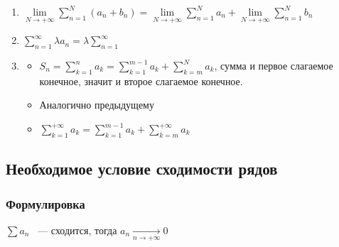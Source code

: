 \documentclass{article}
\begin{document}
                \begin{enumerate}
                
                    \item $\lim\limits_{N \rightarrow +\infty} \sum\limits^N_{n = 1} (a_n + b_n) = \lim\limits_{N \rightarrow +\infty} \sum\limits^N_{n = 1} a_n + \lim\limits_{N \rightarrow +\infty} \sum\limits^N_{n = 1} b_n$
                    
                    \item $\sum\limits^{\infty}_{n = 1} \lambda a_n = \lambda \sum\limits^{\infty}_{n = 1}$
                    
                    \item
                    
                        \begin{itemize}
                        
                            \item $S_n = \sum\limits^n_{k = 1} a_k = \sum\limits^{m - 1}_{k = 1} a_k + \sum\limits_{k = m}^N a_k$, сумма и первое слагаемое конечное, значит и второе слагаемое конечное.
                            
                            \item Аналогично предыдущему
                            
                            \item $\sum\limits^{+\infty}_{k = 1} a_k = \sum\limits^{m - 1}_{k = 1} a_k + \sum\limits^{+\infty}_{k = m} a_k$
                            
                        \end{itemize}
                        
                \end{enumerate}
        
        \subsection{Необходимое условие сходимости рядов}
        
            \subsubsection{Формулировка}
            
                $\sum a_n$ ~--- сходится, тогда $a_n \xrightarrow[n \rightarrow +\infty]{} 0$
                
\end{document}
